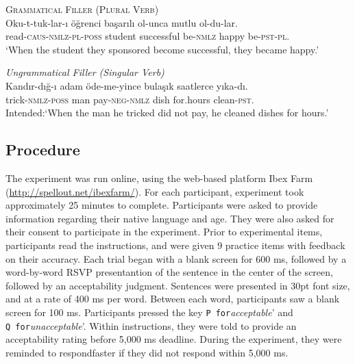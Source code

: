 \documentclass[
  english,
  doc,floatsintext]{apa6}
\begin{document}
\begin{exe}
\ex \label{item:exp2FillerItems}
\begin{xlist}

\ex \label{item:exp2FillerItems_plural} \textsc{Grammatical Filler (Plural Verb)}\\ 
  \gll Oku-t-tuk-lar-ı öğrenci başarılı ol-unca mutlu ol-du-lar.\\ 
  read-\textsc{caus}-\textsc{nmlz}-\textsc{pl}-\textsc{poss}  student successful be-\textsc{nmlz} happy be-\textsc{pst}-\textsc{pl}.\\
  \glt `When the student they sponsored become successful, they became happy.' 

\ex \label{item:exp2FillerItems_singular} \textit{Ungrammatical Filler (Singular Verb)}\\ 
  \gll *Kandır-dığ-ı adam öde-me-yince bulaşık saatlerce yıka-dı.\\ 
  trick-\textsc{nmlz}-\textsc{poss}  man pay-\textsc{neg}-\textsc{nmlz} dish for.hours clean-\textsc{pst}.\\
  \glt Intended:`When the man he tricked did not pay, he cleaned dishes for hours.'
\end{xlist}
\end{exe}

\hypertarget{procedure-1}{%
\subsection{Procedure}\label{procedure-1}}

The experiment was run online, using the web-based platform Ibex Farm (\url{http://spellout.net/ibexfarm/}). For each participant, experiment took approximately 25 minutes to complete.
Participants were asked to provide information regarding their native language and age. They were also asked for their consent to participate in the experiment.
Prior to experimental items, participants read the instructions, and were given 9 practice items with feedback on their accuracy.
Each trial began with a blank screen for 600 ms, followed by a word-by-word RSVP presentantion of the sentence in the center of the screen, followed by an acceptability judgment. Sentences were presented in 30pt font size, and at a rate of 400 ms per word. Between each word, participants saw a blank screen for 100 ms. Participants pressed the key \texttt{P\textquotesingle{}\ for}\textit{acceptable}' and \texttt{Q\textquotesingle{}\ for}\textit{unacceptable}'.
Within instructions, they were told to provide an acceptability rating before 5,000 ms deadline. During the experiment, they were reminded to respondfaster if they did not respond within 5,000 ms.
\end{document}
